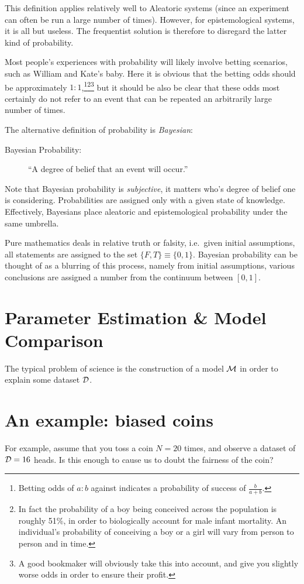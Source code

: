 This definition applies relatively well to Aleatoric systems (since an experiment can often be run a large number of times). However, for epistemological systems, it is all but useless. The frequentist solution is therefore to disregard the latter kind of probability.

Most people's experiences with probability will likely involve betting scenarios, such as William and Kate's baby. Here it is obvious that the betting odds should be approximately $1:1$,\footnote{Betting odds of $a:b$ against indicates a probability of success of $\frac{b}{a+b}$.}\footnote{In fact the probability of a boy being conceived across the population is roughly 51\%, in order to biologically account for male infant mortality. An individual's probability of conceiving a boy or a girl will vary from person to person and in time.}\footnote{A good bookmaker will obviously take this into account, and give you slightly worse odds in order to ensure their profit.} but it should be also be clear that these odds most certainly do not refer to an event that can be repeated an arbitrarily large number of times.

The alternative definition of probability is {\em Bayesian\/}:
\begin{description}
  \item[Bayesian Probability:] ``A degree of belief that an event will occur.'' 
\end{description}
Note that Bayesian probability is {\em subjective}, it matters who's degree of belief one is considering. Probabilities are assigned only with a given state of knowledge. Effectively, Bayesians place aleatoric and epistemological probability under the same umbrella. 

Pure mathematics deals in relative truth or falsity, i.e.\ given initial assumptions, all statements are assigned to the set $\{F,T\}\equiv\{0,1\}$. Bayesian probability can be thought of as a blurring of this process, namely from initial assumptions, various conclusions are assigned a number from the continuum between $[0,1]$.

\section{Parameter Estimation \& Model Comparison}
\label{sec:bay:model_comp}
The typical problem of science is the construction of a model $\mathcal{M}$ in order to explain some dataset $\mathcal{D}$. 


\section{An example: biased coins}
For example, assume that you toss a coin $N=20$ times, and observe a dataset of $\mathcal{D} = 16$ heads. Is this enough to cause us to doubt the fairness of the coin?

